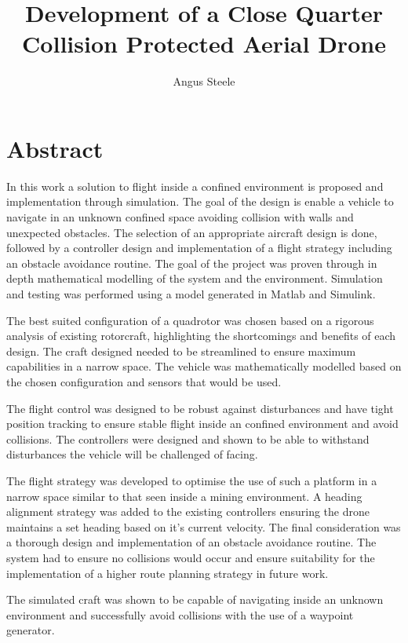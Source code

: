 \documentclass[12pt]{report}
\title{Development of a Close Quarter Collision Protected Aerial Drone}
\author{Angus Steele}
\begin{document}
\maketitle


\chapter*{Abstract}
In this work a solution to flight inside a confined environment is proposed and implementation through simulation. The goal of the design is enable a vehicle to navigate in an unknown confined space avoiding collision with walls and unexpected obstacles. The selection of an appropriate aircraft design is done, followed by a controller design and implementation of a flight strategy including an obstacle avoidance routine. The goal of the project was proven through in depth mathematical modelling of the system and the environment. Simulation and testing was performed using a model generated in Matlab and Simulink.

The best suited configuration of a quadrotor was chosen based on a rigorous analysis of existing rotorcraft, highlighting the shortcomings and benefits of each design. The craft designed needed to be streamlined to ensure maximum capabilities in a narrow space. The vehicle was mathematically modelled based on the chosen configuration and sensors that would be used.

The flight control was designed to be robust against disturbances and have tight position tracking to ensure stable flight inside an confined environment and avoid collisions. The controllers were designed and shown to be able to withstand disturbances the vehicle will be challenged of facing.

The flight strategy was developed to optimise the use of such a platform in a narrow space similar to that seen inside a mining environment. A heading alignment strategy was added to the existing controllers ensuring the drone maintains a set heading based on it's current velocity. The final consideration was a thorough design and implementation of an obstacle avoidance routine. The system had to ensure no collisions would occur and ensure suitability for the implementation of a higher route planning strategy in future work.

The simulated craft was shown to be capable of navigating inside an unknown environment and successfully avoid collisions with the use of a waypoint generator.
\end{document}
